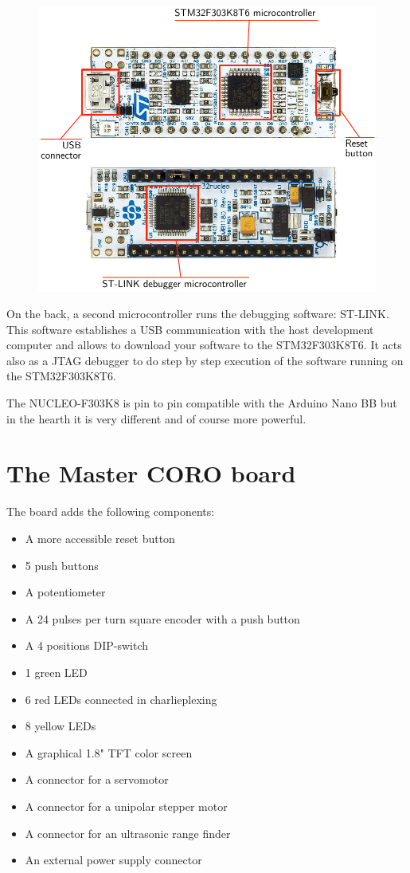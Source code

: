\documentclass[11pt]{report}
\begin{document}
\begin{figure}[htbp] %
   \centering
   \includegraphics[scale=.7]{img/nucleo.pdf} 
   \label{fig:example}
\end{figure}


On the back, a second microcontroller runs the debugging software: ST-LINK. This software establishes a USB communication with the host development computer and allows to download your software to the STM32F303K8T6. It acts also as a JTAG debugger to do step by step execution of the software running on the STM32F303K8T6.

The NUCLEO-F303K8 is pin to pin compatible with the Arduino Nano BB but in the hearth it is very different and of course more powerful. 

\section{The Master CORO board}

The board adds the following components:
\begin{itemize}
\setlength\itemsep{-.2em}
\item{A more accessible reset button}
\item{5 push buttons}
\item{A potentiometer}
\item{A 24 pulses per turn square encoder with a push button}
\item{A 4 positions DIP-switch}
\item{1 green LED}
\item{6 red LEDs connected in charlieplexing}
\item{8 yellow LEDs}
\item{A graphical 1.8" TFT color screen}
\item{A connector for a servomotor}
\item{A connector for a unipolar stepper motor}
\item{A connector for an ultrasonic range finder}
\item{An external power supply connector}
\end{itemize}
\end{document}

